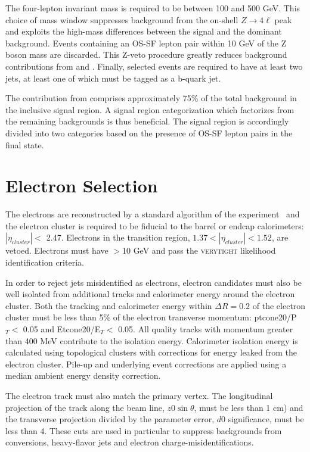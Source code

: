 The four-lepton invariant mass is required to be between 100 and 500 GeV. 
This choice of mass window suppresses background from the on-shell $Z\to4\ell$ peak and exploits the high-mass differences between the signal and the dominant \ttZ background. 
Events containing an OS-SF lepton pair within 10 GeV of the Z boson mass are discarded. 
This Z-veto procedure greatly reduces background contributions from \ZZ and \ttZ. 
Finally, selected events are required to have at least two jets, at least one of which must be tagged as a b-quark jet.  

The contribution from \ttZ comprises approximately 75\% of the total background in the inclusive signal region. 
A signal region categorization which factorizes \ttZ from the remaining backgrounds is thus beneficial. 
The signal region is accordingly divided into two categories based on the presence of OS-SF lepton pairs in the final state. 

\section{Electron Selection}

The electrons are reconstructed by a standard algorithm of the
experiment~\cite{ATLAS-CONF-2014-032} and the electron cluster is required to be fiducial 
to the barrel or endcap calorimeters: $|\eta_{cluster}| < $ 2.47. Electrons
in the transition region, $1.37 < |\eta_{cluster}| < 1.52$, are vetoed.
Electrons must have \pt$>$10 GeV and pass the \textsc{verytight} likelihood identification criteria.

In order to reject jets misidentified as electrons,
electron candidates  must also be well isolated from additional tracks and
calorimeter energy around the electron cluster. Both the tracking 
and calorimeter energy within $\Delta R=0.2$ of the electron
cluster must be less than 5\% of the electron transverse momentum: ptcone20/P$_T <$ 0.05 and Etcone20/E$_T <$ 0.05.
All quality tracks with momentum greater than 400 MeV contribute to the isolation
energy.  Calorimeter isolation energy is calculated
using topological clusters with corrections for energy leaked from the
electron cluster. Pile-up and underlying event corrections are applied using
a median ambient energy density correction.  

The electron track must also match the primary vertex. The longitudinal projection 
of the track along the beam line, $z0\sin{\theta}$, must be less than 1 cm) and the transverse projection divided by the
parameter error, $d0$ significance, must be less than 4. These cuts are used in particular to suppress backgrounds
from conversions, heavy-flavor jets and electron charge-misidentifications. 



